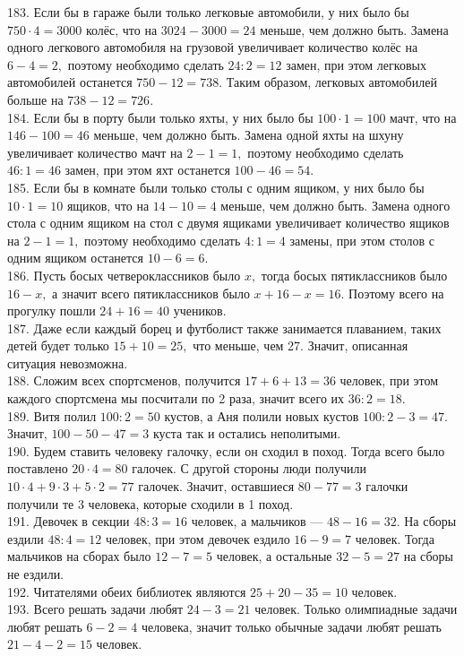 183. Если бы в гараже были только легковые автомобили, у них было бы $750\cdot4=3000$ колёс, что на $3024-3000=24$ меньше, чем должно быть. Замена одного легкового автомобиля на грузовой увеличивает количество колёс на $6-4=2,$ поэтому необходимо сделать $24:2=12$ замен, при этом легковых автомобилей останется $750-12=738.$ Таким образом, легковых автомобилей больше на $738-12=726.$\\
184. Если бы в порту были только яхты, у них было бы $100\cdot1=100$ мачт, что на $146-100=46$ меньше, чем должно быть. Замена одной яхты на шхуну увеличивает количество мачт на $2-1=1,$ поэтому необходимо сделать $46:1=46$ замен, при этом яхт останется $100-46=54.$\\
185. Если бы в комнате были только столы с одним ящиком, у них было бы $10\cdot1=10$ ящиков, что на $14-10=4$ меньше, чем должно быть. Замена одного стола с одним ящиком на стол с двумя ящиками увеличивает количество ящиков на $2-1=1,$ поэтому необходимо сделать $4:1=4$ замены, при этом столов с одним ящиком останется $10-6=6.$\\
186. Пусть босых четвероклассников было $x,$ тогда босых пятиклассников было $16-x,$ а значит всего пятиклассников было $x+16-x=16.$ Поэтому всего на прогулку пошли $24+16=40$ учеников.\\
187. Даже если каждый борец и футболист также занимается плаванием, таких детей будет только $15+10=25,$ что меньше, чем 27. Значит, описанная ситуация невозможна.\\
188. Сложим всех спортсменов, получится $17+6+13=36$ человек, при этом каждого спортсмена мы посчитали по 2 раза, значит всего их $36:2=18.$\\
189. Витя полил $100:2=50$ кустов, а Аня полили новых кустов $100:2-3=47.$ Значит, $100-50-47=3$ куста так и остались неполитыми.\\
190. Будем ставить человеку галочку, если он сходил в поход. Тогда всего было поставлено $20\cdot4=80$ галочек. С другой стороны люди получили $10\cdot4+9\cdot3+5\cdot2=77$ галочек. Значит, оставшиеся $80-77=3$ галочки получили те 3 человека, которые сходили в 1 поход.\\
191. Девочек в секции $48:3=16$ человек, а мальчиков --- $48-16=32.$ На сборы ездили $48:4=12$ человек, при этом девочек ездило $16-9=7$ человек. Тогда мальчиков на сборах было $12-7=5$ человек, а остальные $32-5=27$ на сборы не ездили.\\
192. Читателями обеих библиотек являются $25+20-35=10$ человек.\\
193. Всего решать задачи любят $24-3=21$ человек. Только олимпиадные задачи любят решать $6-2=4$ человека, значит только обычные задачи любят решать $21-4-2=15$ человек.\\
